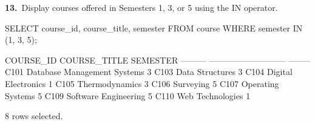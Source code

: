 \noindent\begin{minipage}{\linewidth}
\begingroup{}
{\fontsize{14}{17}\selectfont\textbf{13.}}\ Display courses offered in Semesters 1, 3, or 5 using the IN operator.\par
\endgroup\vspace{12pt}


\begin{sqlcode}
SELECT course_id, course_title, semester
FROM course WHERE semester IN (1, 3, 5);
\end{sqlcode}

\vspace{18pt}


\begin{sqlout}[fontsize=\small]
COURSE_ID  COURSE_TITLE                 SEMESTER
---------  ---------------------------  --------
C101       Database Management Systems         3
C103       Data Structures                     3
C104       Digital Electronics                 1
C105       Thermodynamics                      3
C106       Surveying                           5
C107       Operating Systems                   5
C109       Software Engineering                5
C110       Web Technologies                    1

8 rows selected.
\end{sqlout}
\end{minipage}\par\vspace{24pt}

